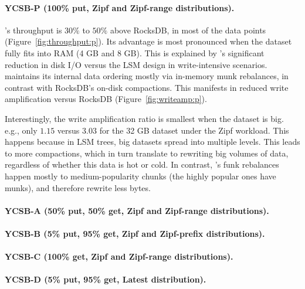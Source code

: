 \paragraph{YCSB-P (100\% put, Zipf and Zipf-range distributions).} 
\sys's throughput is $30\%$ to $50\%$ above RocksDB, in most of the data points (Figure~\ref{fig:throughput:p}). 
Its advantage is most pronounced when the dataset fully fits into RAM (4 GB and 8 GB). This is explained by 
\sys's significant reduction in disk I/O versus the LSM design in write-intensive scenarios. \sys\/ maintains its
internal data ordering mostly via in-memory munk rebalances, in contrast with RocksDB's on-disk compactions. 
This manifests in reduced write amplification versus RocksDB (Figure~\ref{fig:writeamp:p}). 

Interestingly, the write amplification ratio is smallest when the dataset is big. 
e.g., only $1.15$ versus $3.03$ for the 32 GB dataset under the Zipf workload. 
This happens because in LSM  trees, big datasets spread into multiple levels. 
This leads to more compactions, which in turn translate to rewriting big volumes of data, 
regardless of whether this data is hot or cold. In contrast, \sys's funk rebalances 
happen mostly to medium-popularity chunks (the highly popular ones have munks), 
and therefore rewrite less bytes.  

\paragraph{YCSB-A (50\% put, 50\% get, Zipf and Zipf-range distributions).}

\paragraph{YCSB-B (5\% put, 95\% get, Zipf and Zipf-prefix distributions).}

\paragraph{YCSB-C (100\% get, Zipf and Zipf-range distributions).}  

\paragraph{YCSB-D (5\% put, 95\% get, Latest distribution).}

